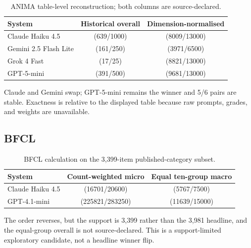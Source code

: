\begin{table}[ht]
\centering
\caption{ANIMA table-level reconstruction; both columns are source-declared.}
\label{tab:reviewer-anima-recomputation}
\begin{tabular}{lcc}
\toprule System & Historical overall & Dimension-normalised \\
\midrule
Claude Haiku 4.5 & (639/1000) & (8009/13000) \\
Gemini 2.5 Flash Lite & (161/250) & (3971/6500) \\
Grok 4 Fast & (17/25) & (8821/13000) \\
GPT-5-mini & (391/500) & (9681/13000) \\
\bottomrule
\end{tabular}
\end{table}

Claude and Gemini swap; GPT-5-mini remains the winner and 5/6 pairs are stable.  Exactness is relative to the displayed table because raw prompts, grades, and weights are unavailable.

\subsection{BFCL}

\begin{table}[ht]
\centering
\caption{BFCL calculation on the 3,399-item published-category subset.}
\label{tab:reviewer-bfcl-recomputation}
\begin{tabular}{lcc}
\toprule System & Count-weighted micro & Equal ten-group macro \\
\midrule
Claude Haiku 4.5 & (16701/20600) & (5767/7500) \\
GPT-4.1-mini & (225821/283250) & (11639/15000) \\
\bottomrule
\end{tabular}
\end{table}

The order reverses, but the support is 3,399 rather than the 3,981 headline, and the equal-group overall is not source-declared.  This is a support-limited exploratory candidate, not a headline winner flip.

